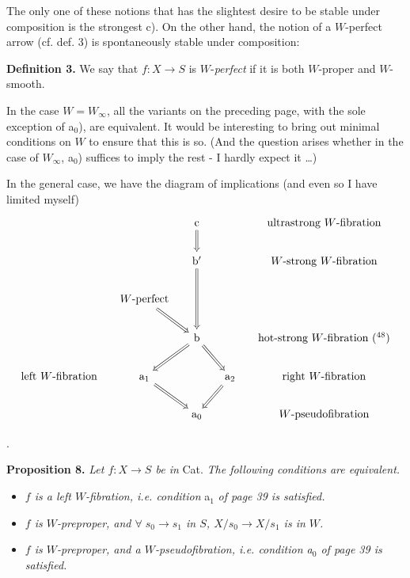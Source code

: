 \documentclass[11pt,leqno]{article}
\newcommand{\printedpage}[1]{\marginpar{\footnotesize p.~#1}}
\newcommand{\msp}[1]{\marginpar{\footnotesize [#1]}}
\newcommand{\fl}{\longrightarrow}
\begin{document}
\printedpage{30}
\msp{page 40}The only one of these notions that has the slightest desire to be stable under composition is the strongest c). On the other hand, the notion of a $W$-perfect arrow (cf. def. 3) is spontaneously stable under composition:

\textbf{Definition 3.} We say that $f : X\fl S$ is $W$-\textit{perfect} if it is both $W$-proper and $W$-smooth.

In the case $W=W_\infty$, all the variants on the preceding page, with the sole exception of a$_0$), are equivalent. It would be interesting to bring out minimal conditions on $W$ to ensure that this is so. (And the question arises whether in the case of $W_\infty$, a$_0$) suffices to imply the rest - I hardly expect it \dots)

In the general case, we have the diagram of implications (and even so I have limited myself)
\[
\begin{tikzcd}[column sep=small]
 & & \mathrm{c} \arrow[d, Rightarrow] & & \text{ultrastrong $W$-fibration} \\
 & & \mathrm{b}' \arrow[dd, Rightarrow] & & \text{$W$-strong $W$-fibration} \\
 & \text{$W$-perfect} \arrow[dr, Rightarrow] & & & \\
 & & \mathrm{b} \arrow[dl, Rightarrow] \arrow[dr, Rightarrow] & & \text{hot-strong $W$-fibration (\footnotemark[48])} \\
\text{left $W$-fibration} & \mathrm{a}_1 \arrow[dr, Rightarrow] & & \mathrm{a}_2 \arrow[dl, Rightarrow] & \text{right $W$-fibration} \\
 & & \mathrm{a}_0 & & \text{$W$-pseudofibration}
\end{tikzcd}
\]

.

\msp{page 41}\textbf{Proposition 8.} \textit{Let $f : X\fl S$ be in} Cat. \textit{The following conditions are equivalent.}

\begin{itemize}
\item[\textit{a)}] \textit{$f$ is a left $W$-fibration, i.e. condition} a$_1$ \textit{of page 39 is satisfied.}

\item[\textit{b)}] \textit{$f$ is $W$-preproper, and $\forall\; s_0\fl s_1$ in $S$, $X/s_0\fl X/s_1$ is in $W$.}

\item[\textit{c)}] \textit{$f$ is $W$-preproper, and a $W$-pseudofibration, i.e. condition a$_0$ of page 39 is satisfied.} %
\end{itemize}
\end{document}
